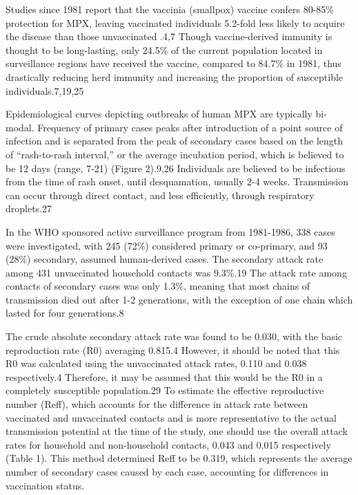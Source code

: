 Studies since 1981 report that the vaccinia (smallpox) vaccine confers 80-85\% protection for MPX, leaving vaccinated individuals 5.2-fold less likely to acquire the disease than those unvaccinated .4,7 Though vaccine-derived immunity is thought to be long-lasting, only 24.5\% of the current population located in surveillance regions have received the vaccine, compared to 84.7\% in 1981, thus drastically reducing herd immunity and increasing the proportion of susceptible individuals.7,19,25 

Epidemiological curves depicting outbreaks of human MPX are typically bi-modal. Frequency of primary cases peaks after introduction of a point source of infection and is separated from the peak of secondary cases based on the length of “rash-to-rash interval,” or the average incubation period, which is believed to be 12 days (range, 7-21) (Figure 2).9,26 Individuals are believed to be infectious from the time of rash onset, until desquamation, usually 2-4 weeks. Transmission can occur through direct contact, and less efficiently, through respiratory droplets.27 

In the WHO sponsored active surveillance program from 1981-1986, 338 cases were investigated, with 245 (72\%) considered primary or co-primary, and 93 (28\%) secondary, assumed human-derived cases. The secondary attack rate among 431 unvaccinated household contacts was 9.3\%.19 The attack rate among contacts of secondary cases was only 1.3\%, meaning that most chains of transmission died out after 1-2 generations, with the exception of one chain which lasted for four generations.8 

The crude absolute  secondary attack rate was found to be 0.030, with the basic reproduction rate (R0) averaging 0.815.4 However, it should be noted that this R0 was calculated using the unvaccinated attack rates, 0.110 and 0.038 respectively.4 Therefore, it may be assumed that this would be the R0 in a completely susceptible population.29 To estimate the effective reproductive number (Reff), which accounts for the difference in attack rate between vaccinated and unvaccinated contacts and is more representative to the actual transmission potential at the time of the study, one should use the overall attack rates for household and non-household contacts, 0.043 and 0.015 respectively (Table 1). This method determined Reff to be 0.319, which represents the average number of secondary cases caused by each case, accounting for differences in vaccination status. 

